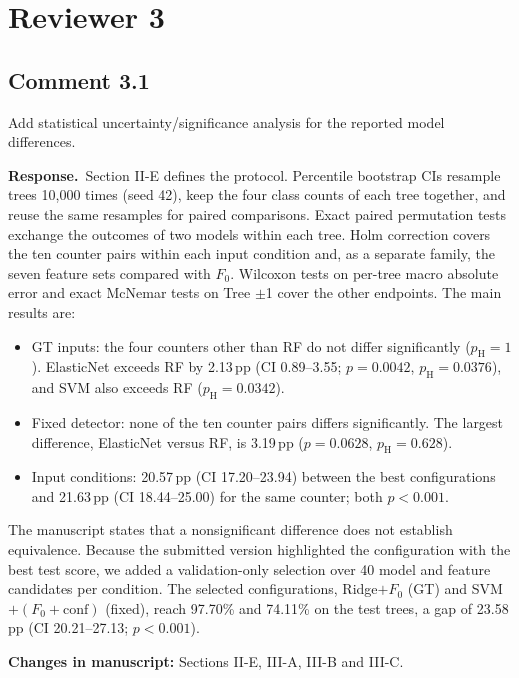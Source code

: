 \documentclass[10pt,a4paper]{article}
\newcommand{\resp}{\textbf{Response.}\ }
\newcommand{\changes}[1]{\par\textbf{Changes in manuscript:} #1}
\newcommand{\pH}{p_{\mathrm{H}}}
\newcommand{\pp}{\,pp}
\begin{document}
\section{Reviewer 3}

\subsection{Comment 3.1}
\begin{cmt}
Add statistical uncertainty/significance analysis for the reported model differences.
\end{cmt}
\resp Section II-E defines the protocol. Percentile bootstrap CIs resample trees 10,000
times (seed 42), keep the four class counts of each tree together, and reuse the same
resamples for paired comparisons. Exact paired permutation tests exchange the outcomes of
two models within each tree. Holm correction covers the ten counter pairs within each
input condition and, as a separate family, the seven feature sets compared with $F_0$.
Wilcoxon tests on per-tree macro absolute error and exact McNemar tests on Tree $\pm$1
cover the other endpoints. The main results are:
\begin{itemize}
\item GT inputs: the four counters other than RF do not differ significantly ($\pH=1$).
  ElasticNet exceeds RF by 2.13\pp{} (CI 0.89--3.55; $p=0.0042$, $\pH=0.0376$), and SVM
  also exceeds RF ($\pH=0.0342$).
\item Fixed detector: none of the ten counter pairs differs significantly. The largest
  difference, ElasticNet versus RF, is 3.19\pp{} ($p=0.0628$, $\pH=0.628$).
\item Input conditions: 20.57\pp{} (CI 17.20--23.94) between the best configurations and
  21.63\pp{} (CI 18.44--25.00) for the same counter; both $p<0.001$.
\end{itemize}
The manuscript states that a nonsignificant difference does not establish equivalence.
Because the submitted version highlighted the configuration with the best test score,
we added a validation-only selection over 40 model and feature candidates per condition.
The selected configurations, Ridge$+F_0$ (GT) and SVM$+(F_0+\text{conf})$ (fixed),
reach 97.70\% and 74.11\% on the test trees, a gap of 23.58\pp{} (CI 20.21--27.13;
$p<0.001$).
\changes{Sections II-E, III-A, III-B and III-C.}
\end{document}
